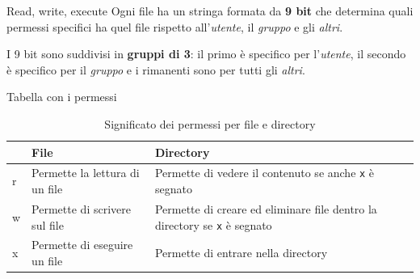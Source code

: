 \begin{frame}{Read, write, execute}
  Ogni file ha un stringa formata da \textbf{9 bit} che determina quali 
  permessi specifici ha quel file rispetto all'\textit{utente}, il 
  \textit{gruppo} e gli \textit{altri}.\bigskip

  I 9 bit sono suddivisi in \textbf{gruppi di 3}: il primo è specifico per 
  l'\textit{utente}, il secondo è specifico per il \textit{gruppo} e i rimanenti
  sono per tutti gli \textit{altri}.
  \begin{figure}
  \end{figure}
\end{frame}

\begin{frame}{Tabella con i permessi}
  \begin{table}
    \begin{tabularx}{\textwidth}{|l|l|X|}
      \hline
      & File  & Directory  \\ \hline
      r & Permette la lettura di un file & Permette di vedere il contenuto se 
      anche \texttt{x} è segnato\\ \hline
      w & Permette di scrivere sul file  & Permette di creare ed eliminare file 
      dentro la directory se \texttt{x} è segnato \\ \hline
      x & Permette di eseguire un file   & Permette di entrare nella 
      directory \\ \hline
    \end{tabularx}
    \caption{Significato dei permessi per file e directory}
  \end{table}
\end{frame}


